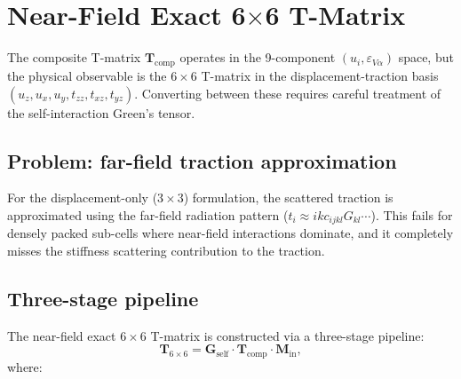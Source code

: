 \documentclass[11pt,a4paper]{article}
\newcommand{\bG}{\mathbf{G}}
\newcommand{\bT}{\mathbf{T}}
\newcommand{\bM}{\mathbf{M}}
\begin{document}
\section{Near-Field Exact 6\texorpdfstring{$\times$}{x}6 T-Matrix}
\label{sec:nearfield}

The composite T-matrix $\bT_\text{comp}$ operates in the 9-component
$(u_i, \varepsilon_{V\alpha})$ space, but the physical observable is
the $6 \times 6$ T-matrix in the displacement-traction basis
$(u_z, u_x, u_y, t_{zz}, t_{xz}, t_{yz})$.  Converting between
these requires careful treatment of the self-interaction Green's
tensor.

\subsection{Problem: far-field traction approximation}

For the displacement-only ($3 \times 3$) formulation, the scattered
traction is approximated using the far-field radiation pattern
($t_i \approx ik c_{ijkl} G_{kl} \cdots$).  This fails for densely
packed sub-cells where near-field interactions dominate, and it
completely misses the stiffness scattering contribution to the
traction.

\subsection{Three-stage pipeline}

The near-field exact $6 \times 6$ T-matrix is constructed via a
three-stage pipeline:
\begin{equation}
  \boxed{
  \bT_{6 \times 6}
  = \bG_\text{self} \cdot \bT_\text{comp} \cdot \bM_\text{in},
  }
  \label{eq:T6x6}
\end{equation}
where:
\end{document}

